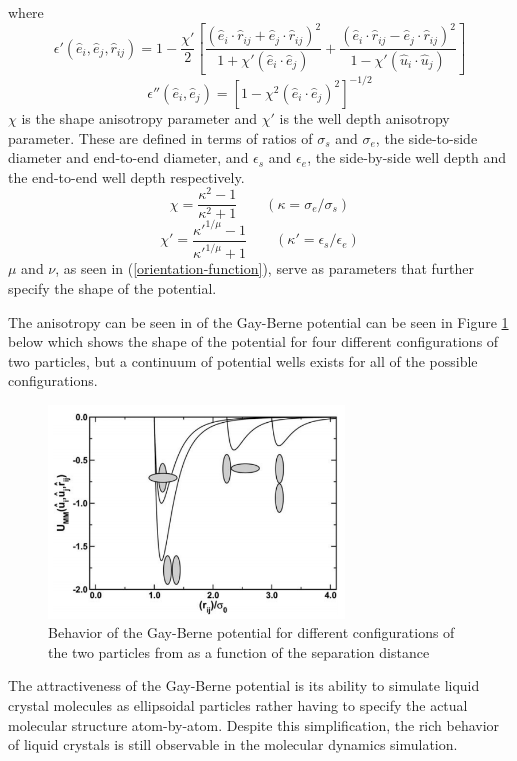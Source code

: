 \documentclass[preprint, aps]{revtex4-1}
\begin{document}
where
	\begin{equation} \label{o-func1}
		\epsilon'(\hat{e}_i,\hat{e}_j,\hat{r}_{ij}) 
		= 1 - \frac{\chi'}{2}
		\left[
			\frac{
				(\hat{e}_i \cdot \hat{r}_{ij} 
				+ \hat{e}_j \cdot \hat{r}_{ij})^2
			}
			{
				1+\chi'(\hat{e}_i \cdot \hat{e}_j)
			}
			+ \frac{
				(\hat{e}_i \cdot \hat{r}_{ij} 
				- \hat{e}_j \cdot \hat{r}_{ij})^2
				}
				{
					1-\chi'(\hat{u}_i \cdot \hat{u}_j)
				}
		\right]
	\end{equation}
	\begin{equation} \label{o-func2}	
		\epsilon''(\hat{e}_i,\hat{e}_j) 
		= \left[ 1 - \chi^2(\hat{e}_i \cdot \hat{e}_j)^2 \right]^{-1/2}	
	\end{equation}
$\chi$ is the shape anisotropy parameter and $\chi'$ is the well depth 
anisotropy parameter. These are defined in terms of ratios of $\sigma_s$ 
and $\sigma_e$, the side-to-side diameter and end-to-end diameter, and 
$\epsilon_s$ and $\epsilon_e$, the side-by-side well depth and the 
end-to-end well depth respectively.
	\begin{equation} \label{chi}
		\chi = \frac{\kappa^2 - 1}{\kappa^2 + 1} 
		\qquad (\kappa = \sigma_e / \sigma_s)
	\end{equation}
	\begin{equation} \label{chi-prime}	
		\chi' = \frac{\kappa'^{1/\mu} - 1}{\kappa'^{1/\mu} + 1} 
		\qquad (\kappa' = \epsilon_s / \epsilon_e)
	\end{equation}
$\mu$ and $\nu$, as seen in (\ref{orientation-function}), serve as parameters 
that further specify the shape of the potential. 

The anisotropy can be seen in of the Gay-Berne potential can be seen in Figure 
\ref{fig:gb} below which shows the shape of the potential for four different 
configurations of two particles, but a continuum of potential wells exists for 
all of the possible configurations. 
	\begin{figure}[H]
		\centering
		\includegraphics[width=0.7\textwidth]{gb.png}
		\caption{Behavior of the Gay-Berne potential for different 
			configurations of the two particles from \cite{moreno11} as a 
			function of the separation distance}
		\label{fig:gb}
	\end{figure}
The attractiveness of the Gay-Berne potential is its ability to simulate liquid 
crystal molecules as ellipsoidal particles rather having to specify the actual 
molecular structure atom-by-atom. Despite this simplification, the rich behavior
of liquid crystals is still observable in the molecular dynamics simulation.
\end{document}
